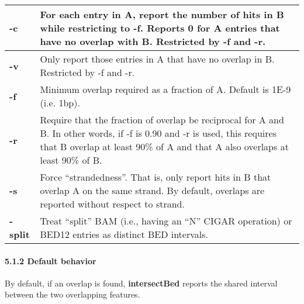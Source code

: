 \documentclass[letterpaper,10pt,english]{sphinxmanual}
\begin{document}
\begin{tabulary}{\linewidth}{|L|L|}
\textbf{-c}
 & 
For each entry in A, report the number of hits in B while restricting to -f. Reports 0 for A entries that have no overlap with B. Restricted by -f and -r.
\\\hline

\textbf{-v}
 & 
Only report those entries in A that have no overlap in B. Restricted by -f and -r.
\\\hline

\textbf{-f}
 & 
Minimum overlap required as a fraction of A. Default is 1E-9 (i.e. 1bp).
\\\hline

\textbf{-r}
 & 
Require that the fraction of overlap be reciprocal for A and B. In other words, if -f is 0.90 and -r is used, this requires that B overlap at least 90\% of A and that A also overlaps at least 90\% of B.
\\\hline

\textbf{-s}
 & 
Force ``strandedness''. That is, only report hits in B that overlap A on the same strand. By default, overlaps are reported without respect to strand.
\\\hline

\textbf{-split}
 & 
Treat ``split'' BAM (i.e., having an ``N'' CIGAR operation) or BED12 entries as distinct BED intervals.
\\\hline
\end{tabulary}



\paragraph{5.1.2 Default behavior}
\label{content/intersectBed:default-behavior}
By default, if an overlap is found, \textbf{intersectBed} reports the shared interval between the two
overlapping features.
\end{document}
